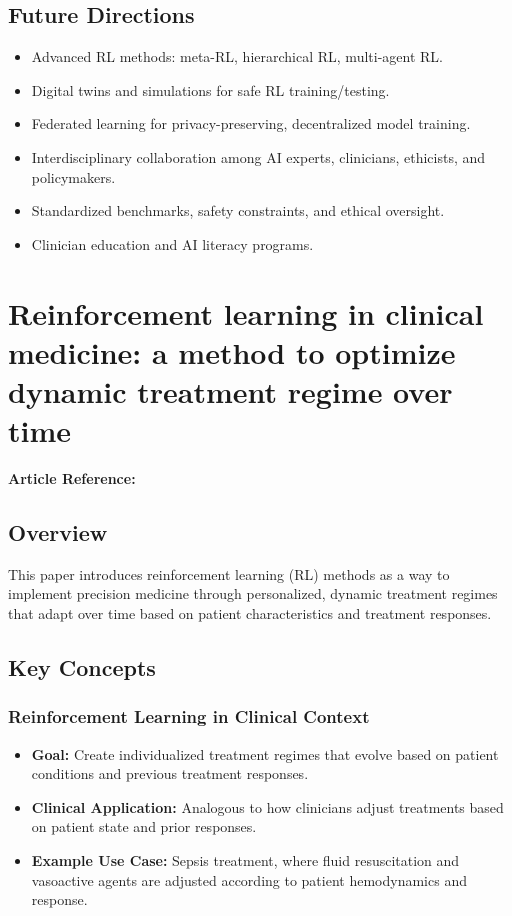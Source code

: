 \subsection*{Future Directions}
\begin{itemize}
    \item Advanced RL methods: meta-RL, hierarchical RL, multi-agent RL.
    \item Digital twins and simulations for safe RL training/testing.
    \item Federated learning for privacy-preserving, decentralized model training.
    \item Interdisciplinary collaboration among AI experts, clinicians, ethicists, and policymakers.
    \item Standardized benchmarks, safety constraints, and ethical oversight.
    \item Clinician education and AI literacy programs.
\end{itemize}


\section{Reinforcement learning in clinical medicine: a method to optimize dynamic treatment regime over time}
\textbf{Article Reference:} \cite{zhangReinforcementLearningClinical2019}
\subsection*{Overview}
This paper introduces reinforcement learning (RL) methods as a way to implement precision medicine through personalized, dynamic treatment regimes that adapt over time based on patient characteristics and treatment responses.

\subsection*{Key Concepts}

\subsubsection*{Reinforcement Learning in Clinical Context}
\begin{itemize}
    \item \textbf{Goal:} Create individualized treatment regimes that evolve based on patient conditions and previous treatment responses.
    \item \textbf{Clinical Application:} Analogous to how clinicians adjust treatments based on patient state and prior responses.
    \item \textbf{Example Use Case:} Sepsis treatment, where fluid resuscitation and vasoactive agents are adjusted according to patient hemodynamics and response.
\end{itemize}

